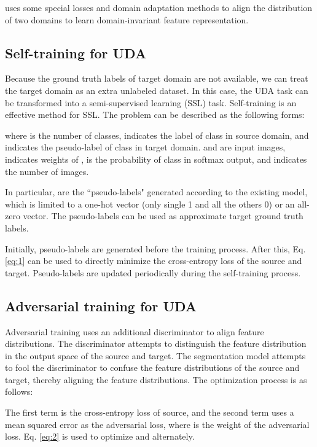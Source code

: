 \documentclass[runningheads]{llncs}
\begin{document}
 uses some special losses and domain adaptation methods to align the distribution of two domains to learn domain-invariant feature representation.

\subsection{Self-training for UDA}
Because the ground truth labels of target domain are not available, we can treat the target domain as an extra unlabeled dataset. In this case, the UDA task can be transformed into a semi-supervised learning (SSL) task. Self-training is an effective method for SSL. The problem can be described as the following forms:

where  is the number of classes,  indicates the label of class  in source domain, and  indicates the pseudo-label of class  in target domain.  and  are input images,  indicates weights of ,   is the probability of class  in  softmax output, and  indicates the number of images.

In particular,  are the ``pseudo-labels" generated according to the existing model, which is limited to a one-hot vector (only single 1 and all the others 0) or an all-zero vector.
The pseudo-labels can be used as approximate target ground truth labels.

Initially, pseudo-labels are generated before the training process. After this, Eq.\eqref{eq:1} can be used to directly minimize the cross-entropy loss of the source and target. Pseudo-labels are updated periodically during the self-training process.










\subsection{Adversarial training for UDA}
Adversarial training uses an additional discriminator to align feature distributions. The discriminator  attempts to distinguish the feature distribution in the output space of the source and target. The segmentation model  attempts to fool the discriminator to confuse the feature distributions of the source and target, thereby aligning the feature distributions. The optimization process is as follows:



The first term is the cross-entropy loss of source, and the second term uses a mean squared error as the adversarial loss, where  is the weight of the adversarial loss. Eq. \eqref{eq:2} is used to optimize  and  alternately.
\end{document}

